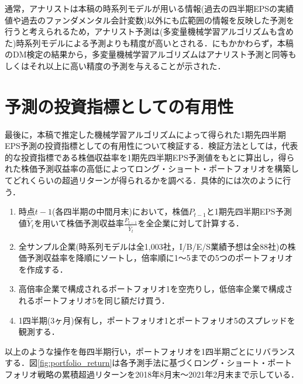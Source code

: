 \documentclass[a4paper，11pt]{jsarticle}
\begin{document}
通常，アナリストは本稿の時系列モデルが用いる情報(過去の四半期EPSの実績値や過去のファンダメンタル会計変数)以外にも広範囲の情報を反映した予測を行うと考えられるため\citep{sakurai1990}，アナリスト予測は(多変量機械学習アルゴリズムも含めた)時系列モデルによる予測よりも精度が高いとされる．にもかかわらず，本稿のDM検定の結果から，多変量機械学習アルゴリズムはアナリスト予測と同等もしくはそれ以上に高い精度の予測を与えることが示された．

\part{予測の投資指標としての有用性} \label{par:portfolio}

最後に，本稿で推定した機械学習アルゴリズムによって得られた1期先四半期EPS予測の投資指標としての有用性について検証する．検証方法としては，代表的な投資指標である株価収益率を1期先四半期EPS予測値をもとに算出し，得られた株価予測収益率の高低によってロング・ショート・ポートフォリオを構築してどれくらいの超過リターンが得られるかを調べる．具体的には次のように行う．

\begin{enumerate}
  \item 時点$t-1$(各四半期の中間月末)において，株価$P_{t-1}$と1期先四半期EPS予測値$\hat{Y}_t$を用いて株価予測収益率$\frac{P_{t-1}}{\hat{Y}_t}$を全企業に対して計算する．
  \item 全サンプル企業(時系列モデルは全1,003社，I/B/E/S業績予想は全88社)の株価予測収益率を降順にソートし，倍率順に1～5までの5つのポートフォリオを作成する．
  \item 高倍率企業で構成されるポートフォリオ1を空売りし，低倍率企業で構成されるポートフォリオ5を同じ額だけ買う．
  \item 1四半期(3ヶ月)保有し，ポートフォリオ1とポートフォリオ5のスプレッドを観測する．
\end{enumerate}

\noindent
以上のような操作を毎四半期行い，ポートフォリオを1四半期ごとにリバランスする．図\ref{fig:portfolio_return}は各予測手法に基づくロング・ショート・ポートフォリオ戦略の累積超過リターンを2018年8月末～2021年2月末まで示している．
\end{document}
